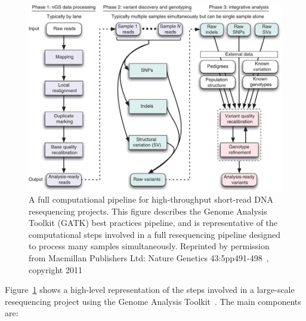 \begin{figure}
\centering
\includegraphics[width=1\textwidth]{figures/ng-806-F1.jpg}
\caption{A full computational pipeline for high-throughput short-read DNA resequencing projects. This figure describes the Genome Analysis Toolkit (GATK) best practices pipeline, and is representative of the computational steps involved in a full resequencing pipeline designed to process many samples simultaneously. Reprinted by permission from Macmillan Publishers Ltd: Nature Genetics 43:5pp491-498~\cite{DePristo:2011fo}, copyright 2011}
\label{gatk_pipeline}
\end{figure}

Figure~\ref{gatk_pipeline} shows a high-level representation of the steps involved in a large-scale resequencing project using the Genome Analysis Toolkit~\cite{DePristo:2011fo}. The main components are:

